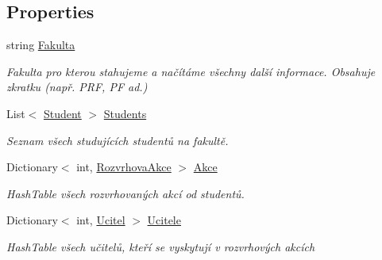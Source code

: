 \subsection*{Properties}
\begin{DoxyCompactItemize}
\item 
string \hyperlink{class_analyza_rozvrhu_1_1_s_t_a_g___classes_1_1_s_t_a_g___database_a69eb11879c56770b1a5f7af80a84df48}{Fakulta}
\begin{DoxyCompactList}\small\item\em Fakulta pro kterou stahujeme a načítáme všechny další informace. Obsahuje zkratku (např. P\+RF, PF ad.) \end{DoxyCompactList}\item 
List$<$ \hyperlink{class_analyza_rozvrhu_1_1_s_t_a_g___classes_1_1_student}{Student} $>$ \hyperlink{class_analyza_rozvrhu_1_1_s_t_a_g___classes_1_1_s_t_a_g___database_af0935621edfcdd25d04e25722381e5db}{Students}
\begin{DoxyCompactList}\small\item\em Seznam všech studujících studentů na fakultě. \end{DoxyCompactList}\item 
Dictionary$<$ int, \hyperlink{class_analyza_rozvrhu_1_1_s_t_a_g___classes_1_1_rozvrhova_akce}{Rozvrhova\+Akce} $>$ \hyperlink{class_analyza_rozvrhu_1_1_s_t_a_g___classes_1_1_s_t_a_g___database_a8f2345d702674f097b30b96a2b5bed3e}{Akce}
\begin{DoxyCompactList}\small\item\em Hash\+Table všech rozvrhovaných akcí od studentů. \end{DoxyCompactList}\item 
Dictionary$<$ int, \hyperlink{class_analyza_rozvrhu_1_1_s_t_a_g___classes_1_1_ucitel}{Ucitel} $>$ \hyperlink{class_analyza_rozvrhu_1_1_s_t_a_g___classes_1_1_s_t_a_g___database_a9f94adc2f13f6777b24187ad66b8a59b}{Ucitele}
\begin{DoxyCompactList}\small\item\em Hash\+Table všech učitelů, kteří se vyskytují v rozvrhových akcích \end{DoxyCompactList}\item 

\end{DoxyCompactItemize}
